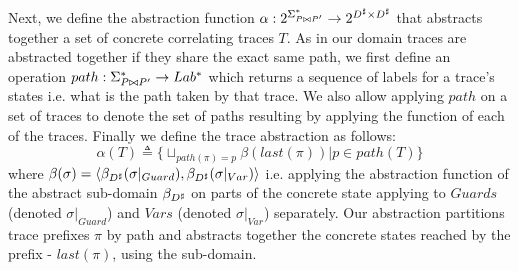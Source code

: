 Next, we define the abstraction function $\alpha : 2^{\Sigma^{*}_{P \bowtie P'}} \rightarrow 2^{D^\sharp \times D^\sharp}$ that abstracts together a set of concrete correlating traces $T$. As in our domain traces are abstracted together if they share the exact same path, we first define an operation $path : \Sigma^{*}_{P \bowtie P'} \rightarrow Lab^{*}$ which returns a sequence of labels for a trace's states i.e. what is the path taken by that trace. We also allow applying $path$ on a set of traces to denote the set of paths resulting by applying the function of each of the traces. Finally we define the trace abstraction as follows:
\[
\alpha(T) \triangleq \{ \sqcup_{path(\pi)=p} \beta(last(\pi)) | p \in path(T) \}
\]
where $\beta(\sigma) = \langle \beta_{D^\sharp}(\sigma|_{Guard}), \beta_{D^\sharp}(\sigma|_{Var}) \rangle$  i.e. applying the abstraction function of the abstract sub-domain $\beta_{D^\sharp}$ on parts of the concrete state applying to $Guards$ (denoted $\sigma|_{Guard}$) and $Vars$ (denoted $\sigma|_{Var}$) separately. Our abstraction partitions trace prefixes $\pi$ by path and abstracts together the concrete states reached by the prefix - $last(\pi)$, using the sub-domain.

